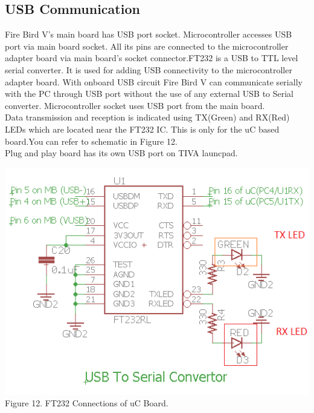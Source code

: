 \documentclass[a4paper,10pt,oneside]{article}
\begin{document}
{	\subsection{\textbf{USB Communication}}
	{Fire Bird V’s main board has USB port socket. Microcontroller accesses USB port via main
		board socket. All its pins are connected to the microcontroller adapter board via main board's
		socket connector.FT232 is a USB to TTL level serial converter. It is used for adding USB connectivity to the
		microcontroller adapter board. With onboard USB circuit Fire Bird V can communicate serially
		with the PC through USB port without the use of any external USB to Serial converter.
		Microcontroller socket uses USB port from the main board.\\
		Data transmission and reception is	indicated using TX(Green) and RX(Red) LEDs which are located near the FT232 IC. This is only for the uC based board.You can refer to schematic in Figure 12.\\
		 Plug and play board has its own USB port on TIVA launcpad. }
		\begin{center}
		\includegraphics{Images/ft232}\\
		Figure 12. FT232 Connections of uC Board.\\
		\end{center}
}
\end{document}
